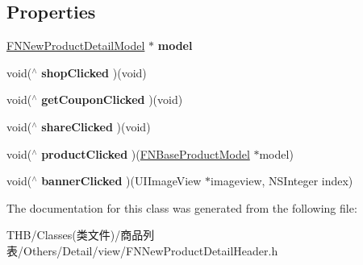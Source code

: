 \subsection*{Properties}
\begin{DoxyCompactItemize}
\item 
\mbox{\label{interface_f_n_new_product_detail_header_a613dcab83f6797e876c5a702f1fa07d1}} 
\mbox{\hyperlink{interface_f_n_new_product_detail_model}{F\+N\+New\+Product\+Detail\+Model}} $\ast$ {\bfseries model}
\item 
\mbox{\label{interface_f_n_new_product_detail_header_ac1170c06f8c2a791164e277be017a5fb}} 
void($^\wedge$ {\bfseries shop\+Clicked} )(void)
\item 
\mbox{\label{interface_f_n_new_product_detail_header_ada23a0d303a6f449deb526214b295162}} 
void($^\wedge$ {\bfseries get\+Coupon\+Clicked} )(void)
\item 
\mbox{\label{interface_f_n_new_product_detail_header_a8e8b8f25794ac8f55ffe166b4bcc18e9}} 
void($^\wedge$ {\bfseries share\+Clicked} )(void)
\item 
\mbox{\label{interface_f_n_new_product_detail_header_a7ddc0ccbf0765f6a91f71be66d915ee6}} 
void($^\wedge$ {\bfseries product\+Clicked} )(\mbox{\hyperlink{interface_f_n_base_product_model}{F\+N\+Base\+Product\+Model}} $\ast$model)
\item 
\mbox{\label{interface_f_n_new_product_detail_header_a48b6f648f2f4d968651c6228994a7009}} 
void($^\wedge$ {\bfseries banner\+Clicked} )(U\+I\+Image\+View $\ast$imageview, N\+S\+Integer index)
\end{DoxyCompactItemize}


The documentation for this class was generated from the following file\+:\begin{DoxyCompactItemize}
\item 
T\+H\+B/\+Classes(类文件)/商品列表/\+Others/\+Detail/view/F\+N\+New\+Product\+Detail\+Header.\+h\end{DoxyCompactItemize}
